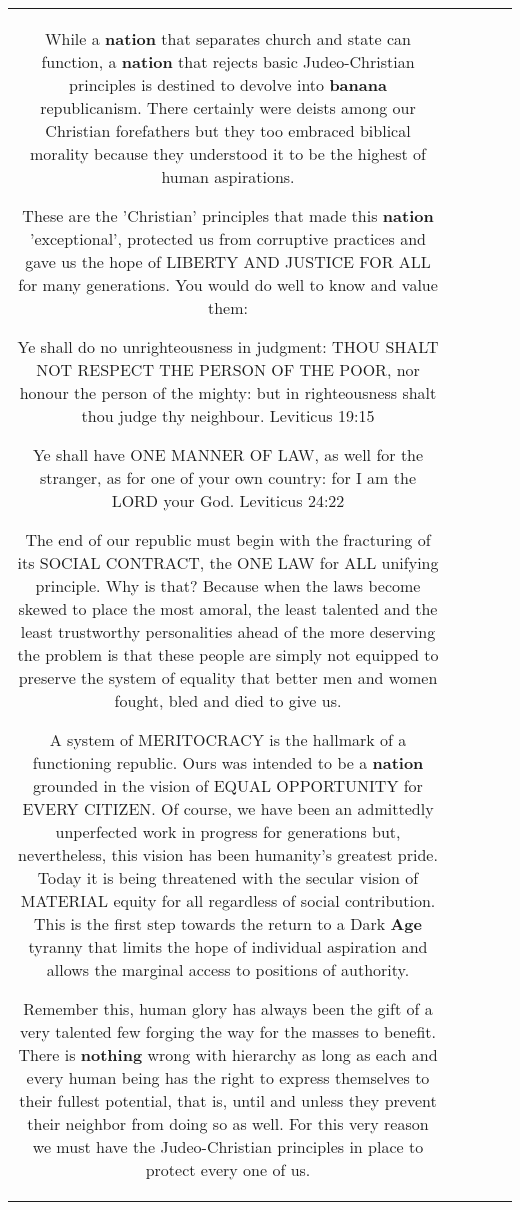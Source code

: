 \documentclass[11pt]{article}
\newlength\mylength
\begin{document}
\begin{center}
\begin{longtable}{|C{.65\mylength}|C{.30\mylength}|C{.12\mylength}|C{.12\mylength}|C{.12\mylength}|}
While a \textbf{nation} that separates church and state can function, a \textbf{nation} that rejects basic Judeo-Christian principles is destined to devolve into \textbf{banana} republicanism. There certainly were deists among our Christian forefathers but they too embraced biblical morality because they understood it to be the highest of human aspirations.

These are the 'Christian' principles that made this \textbf{nation} 'exceptional', protected us from corruptive practices and gave us the hope of LIBERTY AND JUSTICE FOR ALL for many generations. You would do well to know and value them: 

Ye shall do no unrighteousness in judgment:  THOU SHALT NOT RESPECT THE PERSON OF THE POOR, nor honour the person of the mighty: but in righteousness shalt thou judge thy neighbour. Leviticus 19:15 

Ye shall have ONE MANNER OF LAW, as well for the stranger, as for one of your own country: for I am the LORD your God. Leviticus 24:22 

The end of our republic must begin with the fracturing of its SOCIAL CONTRACT, the ONE LAW for ALL unifying principle. Why is that? Because when the laws become skewed to place the most amoral, the least talented and the least trustworthy personalities ahead of the more deserving the problem is that these people are simply not equipped to preserve the system of equality that better men and women fought, bled and died to give us.

A system of MERITOCRACY is the hallmark of a functioning republic.  Ours was intended to be a \textbf{nation} grounded in the vision of EQUAL OPPORTUNITY for EVERY CITIZEN. Of course, we have been an admittedly unperfected work in progress for generations but, nevertheless, this vision has been humanity's greatest pride. Today it is being threatened with the secular vision of MATERIAL equity for all regardless of social contribution. This is the first step towards the return to a Dark \textbf{Age} tyranny that limits the hope of individual aspiration and allows the marginal access to positions of authority. 

Remember this, human glory has always been the gift of a very talented few forging the way for the masses to benefit. There is \textbf{nothing} wrong with hierarchy as long as each and every human being has the right to express themselves to their fullest potential, that is, until and unless they prevent their neighbor from doing so as well. For this very reason we must have the Judeo-Christian principles in place to protect every one of us. 


\end{longtable}
\end{center}
\end{document}

